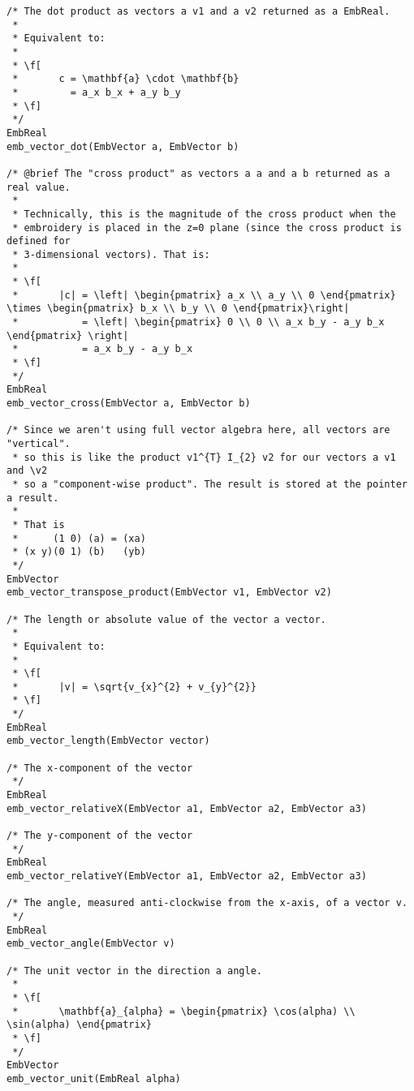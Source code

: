\begin{lstlisting}
/* The dot product as vectors a v1 and a v2 returned as a EmbReal.
 *
 * Equivalent to:
 *
 * \f[
 *       c = \mathbf{a} \cdot \mathbf{b}
 *         = a_x b_x + a_y b_y
 * \f]
 */
EmbReal
emb_vector_dot(EmbVector a, EmbVector b)

/* @brief The "cross product" as vectors a a and a b returned as a real value.
 *
 * Technically, this is the magnitude of the cross product when the
 * embroidery is placed in the z=0 plane (since the cross product is defined for
 * 3-dimensional vectors). That is:
 *
 * \f[
 *       |c| = \left| \begin{pmatrix} a_x \\ a_y \\ 0 \end{pmatrix} \times \begin{pmatrix} b_x \\ b_y \\ 0 \end{pmatrix}\right|
 *           = \left| \begin{pmatrix} 0 \\ 0 \\ a_x b_y - a_y b_x \end{pmatrix} \right|
 *           = a_x b_y - a_y b_x
 * \f]
 */
EmbReal
emb_vector_cross(EmbVector a, EmbVector b)

/* Since we aren't using full vector algebra here, all vectors are "vertical".
 * so this is like the product v1^{T} I_{2} v2 for our vectors a v1 and \v2
 * so a "component-wise product". The result is stored at the pointer a result.
 *
 * That is
 *      (1 0) (a) = (xa)
 * (x y)(0 1) (b)   (yb)
 */
EmbVector
emb_vector_transpose_product(EmbVector v1, EmbVector v2)

/* The length or absolute value of the vector a vector.
 *
 * Equivalent to:
 *
 * \f[
 *       |v| = \sqrt{v_{x}^{2} + v_{y}^{2}}
 * \f]
 */
EmbReal
emb_vector_length(EmbVector vector)

/* The x-component of the vector
 */
EmbReal
emb_vector_relativeX(EmbVector a1, EmbVector a2, EmbVector a3)

/* The y-component of the vector
 */
EmbReal
emb_vector_relativeY(EmbVector a1, EmbVector a2, EmbVector a3)

/* The angle, measured anti-clockwise from the x-axis, of a vector v.
 */
EmbReal
emb_vector_angle(EmbVector v)

/* The unit vector in the direction a angle.
 *
 * \f[
 *       \mathbf{a}_{alpha} = \begin{pmatrix} \cos(alpha) \\ \sin(alpha) \end{pmatrix}
 * \f]
 */
EmbVector
emb_vector_unit(EmbReal alpha)


\end{lstlisting}
